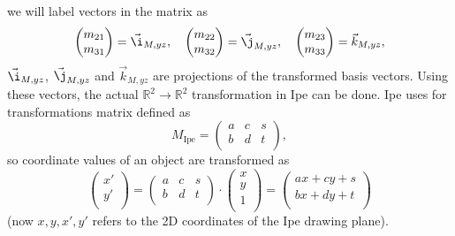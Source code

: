 \documentclass[11pt,a4paper]{article}
\begin{document}
we will label vectors in the matrix as
\begin{equation}
\begin{pmatrix}
m_{21} \\
m_{31} \\
\end{pmatrix}
=\vec{\i}_{M,yz}, \quad
\begin{pmatrix}
m_{22} \\
m_{32} \\
\end{pmatrix}
=\vec{\j}_{M,yz}, \quad
\begin{pmatrix}
m_{23} \\
m_{33} \\
\end{pmatrix}
=\vec{k}_{M,yz},
\end{equation}
$\vec{\i}_{M,yz}$, $\vec{\j}_{M,yz}$ and $\vec{k}_{M,yz}$ are projections of the transformed basis vectors. Using these vectors, the actual $ \mathbb{R}^{2}\rightarrow\mathbb{R}^{2} $ transformation in Ipe can be done. Ipe uses for transformations matrix defined as
\begin{equation}
M_{\text{Ipe}} =
\begin{pmatrix}
a & c & s \\
b & d & t \\
\end{pmatrix},
\end{equation}
so coordinate values of an object are transformed as
\begin{equation}
\begin{pmatrix}
x' \\
y' \\
\end{pmatrix}
=
\begin{pmatrix}
a & c & s \\
b & d & t \\
\end{pmatrix}
\cdot
\begin{pmatrix}
x \\
y \\
1 \\
\end{pmatrix}
=
\begin{pmatrix}
ax+cy+s \\
bx+dy+t \\
\end{pmatrix}
\end{equation}
(now $x,y,x',y'$ refers to the 2D coordinates of the Ipe drawing plane).
\end{document}

